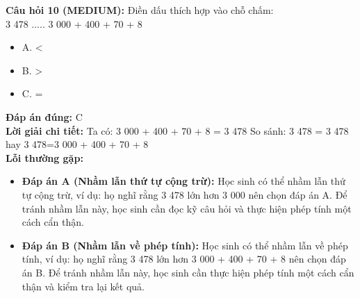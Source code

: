 \documentclass{article}
\begin{document}
\begin{minipage}{\textwidth}
\noindent\textbf{Câu hỏi 10 (MEDIUM):} Điền dấu thích hợp vào chỗ chấm: \\
3 478 ..... 3 000 + 400 + 70 + 8 
\begin{itemize}[label={}]
    \item A. <
    \item B. >
    \item C. =
\end{itemize}
\textbf{Đáp án đúng:} C \\
\textbf{Lời giải chi tiết:} Ta có: 3 000 + 400 + 70 + 8 = 3 478 So sánh: 3 478 = 3 478 hay 3 478=3 000 + 400 + 70 + 8 \\
\textbf{Lỗi thường gặp:}
\begin{itemize}
  \item \textbf{Đáp án A (Nhầm lẫn thứ tự cộng trừ):} Học sinh có thể nhầm lẫn thứ tự cộng trừ, ví dụ: họ nghĩ rằng 3 478 lớn hơn 3 000 nên chọn đáp án A. Để tránh nhầm lẫn này, học sinh cần đọc kỹ câu hỏi và thực hiện phép tính một cách cẩn thận.
  \item \textbf{Đáp án B (Nhầm lẫn về phép tính):} Học sinh có thể nhầm lẫn về phép tính, ví dụ: họ nghĩ rằng 3 478 lớn hơn 3 000 + 400 + 70 + 8 nên chọn đáp án B. Để tránh nhầm lẫn này, học sinh cần thực hiện phép tính một cách cẩn thận và kiểm tra lại kết quả.
\end{itemize}
\end{minipage}
\vspace{1em}
\end{document}
